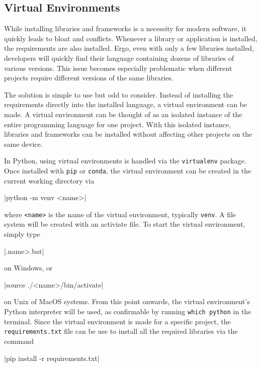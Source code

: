 \documentclass[11pt]{article}
\begin{document}
\inputminted[linenos=true]{python}{python_examples/requirements_example.txt}

\subsection{Virtual Environments}

While installing libraries and frameworks is a necessity for modern software, it quickly leads to bloat and conflicts. Whenever a library or application is installed, the requirements are also installed. Ergo, even with only a few libraries installed, developers will quickly find their language containing dozens of libraries of various versions. This issue becomes especially problematic when different projects require different versions of the same libraries.

The solution is simple to use but odd to consider. Instead of installing the requirements directly into the installed language, a virtual environment can be made. A virtual environment can be thought of as an isolated instance of the entire programming language for one project. With this isolated instance, libraries and frameworks can be installed without affecting other projects on the same device.

In Python, using virtual environments is handled via the \texttt{virtualenv} package. Once installed with \texttt{pip} or \texttt{conda}, the virtual environment can be created in the current working directory via

|python -m venv <name>|

\noindent
where \texttt{<name>} is the name of the virtual environment, typically \texttt{venv}. A file system will be created with an activiate file. To start the virtual environment, simply type

|.\<name>\Scripts\activate.bat|

\noindent
on Windows, or

|source ./<name>/bin/activate|

\noindent
on Unix of MacOS systems. From this point onwards, the virtual environment's Python interpreter will be used, as confirmable by running \texttt{which python} in the terminal. Since the virtual environment is made for a specific project, the \texttt{requirements.txt} file can be use to install all the required libraries via the command

|pip install -r requirements.txt|
\end{document}
